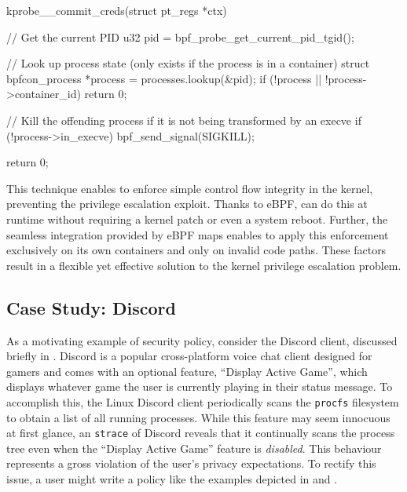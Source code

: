 \begin{listing}[language=c, caption={\bpfcontain{}'s \texttt{commit\_creds} kprobe. This code consists of a query to the eBPF map holding \bpfcontain{}'s process states, killing the process if it is not being transformed by an execve operation (as flagged by \bpfcontain{}'s LSM probes).}, label={lst:priv_protection}, gobble=2]
  kprobe__commit_creds(struct pt_regs *ctx) {
    // Get the current PID
    u32 pid = bpf_probe_get_current_pid_tgid();

    // Look up process state (only exists if the process is in a container)
    struct bpfcon_process *process = processes.lookup(&pid);
    if (!process || !process->container_id)
      return 0;

    // Kill the offending process if it is not being transformed by an execve
    if (!process->in_execve)
      bpf_send_signal(SIGKILL);

    return 0;
  }
\end{listing}

 This technique enables \bpfcontain{} to enforce simple control flow integrity in the kernel, preventing the privilege escalation exploit. Thanks to eBPF, \bpfcontain{} can do this at runtime without requiring a kernel patch or even a system reboot. Further, the seamless integration provided by eBPF maps enables \bpfcontain{} to apply this enforcement exclusively on its own containers and only on invalid code paths. These factors result in a flexible yet effective solution to the kernel privilege escalation problem.

\subsection{Case Study: Discord}


As a motivating example of \bpfcontain{} security policy, consider the Discord
client, discussed briefly in . Discord is a popular
cross-platform voice chat client designed for gamers and comes with an optional
feature, \enquote{Display Active Game}, which displays whatever game the user is
currently playing in their status message. To accomplish this, the Linux Discord
client periodically scans the \texttt{procfs} filesystem to obtain a list of all
running processes.  While this feature may seem innocuous at first glance, an
\texttt{strace} \cite{strace} of Discord reveals that it continually scans the
process tree even when the \enquote{Display Active Game} feature is
\textit{disabled}. This behaviour represents a gross violation of the user's
privacy expectations. To rectify this issue, a user might write a \bpfcontain{}
policy like the examples depicted in  and
.

